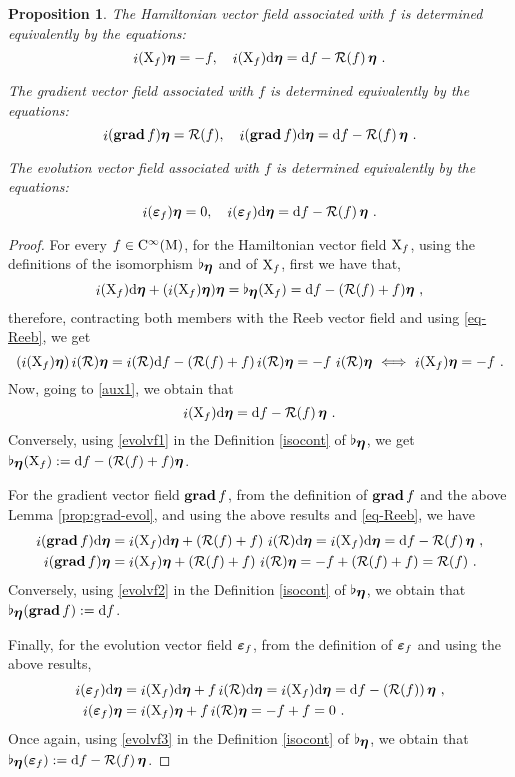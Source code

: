 \documentclass[12pt]{report}
\newtheorem{prop}[teor]{Proposition}
\def\beq{\begin{equation}}
\def\eeq{\end{equation}}
\def\qed{\ifvmode\removelastskip\fi
{\unskip\nobreak\hfil\penalty50\hbox{}\nobreak\hfil
\hbox{\vrule height1.2ex width1.2ex}\parfillskip=0pt
\finalhyphendemerits=0 \par\smallskip}}
\def\d{{\rm d}}
\def\bmeta{\mbox{\boldmath $\eta$}}
\def\evo{\mbox{\boldmath $\varepsilon$}}
\def\X{{\rm X}}
\def\inn{\mathop{i}\nolimits}
\def\Cinfty{{\rm C}^\infty}
\newcommand{\Reeb}{\mathcal{R}}
\begin{document}
\begin{prop}
\label{GraHaEvProp}
The Hamiltonian vector field associated with $f$
is determined equivalently by the equations:
\beq
\inn(\X_f)\bmeta=-f ,\quad
\inn(\X_f)\d\bmeta = \d f-\Reeb(f)\,\bmeta\ .
\label{evolvf1}
\eeq

The gradient vector field associated with $f$ is determined equivalently by the equations:
\beq
 \inn({\bf grad}\,f)\bmeta=\Reeb(f) 
 ,\quad 
\inn({\bf grad}\,f)\d\bmeta=\d f-\Reeb(f)\,\bmeta\ .
\label{evolvf2}
\eeq

The evolution vector field  associated with $f$
is determined equivalently by the equations:
\beq
\inn(\evo_f)\bmeta=0 ,\quad \inn(\evo_f)\d\bmeta=\d f-\Reeb(f)\,\bmeta\ .
\label{evolvf3}
\eeq
\end{prop}
\begin{proof}
For every $f\in\Cinfty({\rm M})$,
for the Hamiltonian vector field $\X_f$,
using the definitions of the isomorphism $\flat_{\bmeta}$ and of $\X_f$, first we have that,
\beq
\label{aux1}
\inn(\X_f)\d\bmeta+(\inn(\X_f)\bmeta)\bmeta=
\flat_{\bmeta}(\X_f)=\d f-(\Reeb(f)+f)\bmeta \ ,
\eeq
therefore, contracting both members with the Reeb vector field and using \eqref{eq-Reeb}, we get
$$
(\inn(\X_f)\bmeta)\inn(\Reeb)\bmeta=
\inn(\Reeb)\d f-(\Reeb(f)+f)\inn(\Reeb)\bmeta=
-f\,\inn(\Reeb)\bmeta
\ \Longleftrightarrow\ \inn(\X_f)\bmeta=-f \ .
$$
Now, going to \eqref{aux1}, we obtain that
$$
\inn(\X_f)\d\bmeta=\d f-\Reeb(f)\,\bmeta \ .
$$
Conversely, using \eqref{evolvf1}
in the Definition \eqref{isocont} of $\flat_{\bmeta}$,
we get $\flat_{\bmeta}(\X_f):=\d f-(\Reeb(f)+f)\bmeta$.

For the gradient vector field ${\bf grad}\,f$,
from the definition of ${\bf grad}\,f$ and the above Lemma \ref{prop:grad-evol},
and using the above results and \eqref{eq-Reeb}, we have
\begin{align*}
\inn({\bf grad}\,f)\d\bmeta &=
\inn(\X_f)\d\bmeta+(\Reeb(f)+f)\,\inn(\Reeb)\d\bmeta=
\inn(\X_f)\d\bmeta=\d f-\Reeb(f)\,\bmeta \ , 
\\
\inn({\bf grad}\,f)\bmeta&= 
\inn(\X_f)\bmeta+(\Reeb(f)+f)\,\inn(\Reeb)\bmeta=
-f+(\Reeb(f)+f)=\Reeb(f) \ .
\end{align*}
Conversely, using \eqref{evolvf2}
in the Definition \eqref{isocont} of $\flat_{\bmeta}$,
we obtain that $\flat_{\bmeta}({\bf grad}\, f):=\d f$.

Finally, for the evolution vector field $\evo_f$, from the definition of $\evo_f$ and using the above results,
 \begin{align*}
\inn(\evo_f)\d\bmeta&=\inn(\X_f)\d\bmeta+f\inn(\Reeb)\d\bmeta=\inn(\X_f)\d\bmeta=
\d f-(\Reeb(f))\,\bmeta \ ,
   \\
\inn(\evo_f)\bmeta &= \inn(\X_f)\bmeta+f\inn(\Reeb)\bmeta=-f+f=0\ .
 \end{align*}
Once again, using \eqref{evolvf3}
in the Definition \eqref{isocont} of $\flat_{\bmeta}$,
we obtain that $\flat_{\bmeta}(\evo_f):=\d f-\Reeb(f)\,\bmeta$.
\qed \end{proof}
\end{document}
